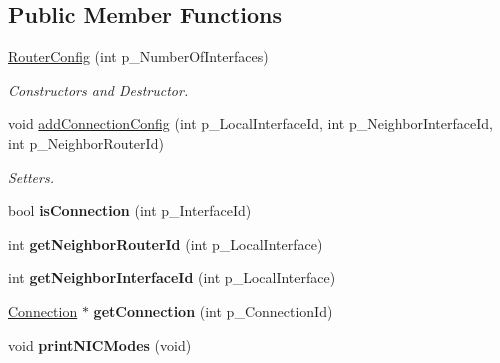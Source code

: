 \subsection*{Public Member Functions}
\begin{DoxyCompactItemize}
\item 
\hypertarget{classRouterConfig_a245e33f079a54805e0beb3497916ca5c}{\hyperlink{classRouterConfig_a245e33f079a54805e0beb3497916ca5c}{Router\-Config} (int p\-\_\-\-Number\-Of\-Interfaces)}\label{classRouterConfig_a245e33f079a54805e0beb3497916ca5c}

\begin{DoxyCompactList}\small\item\em Constructors and Destructor. \end{DoxyCompactList}\item 
\hypertarget{classRouterConfig_ab023773bfcea4de1fe396aae125979a9}{void \hyperlink{classRouterConfig_ab023773bfcea4de1fe396aae125979a9}{add\-Connection\-Config} (int p\-\_\-\-Local\-Interface\-Id, int p\-\_\-\-Neighbor\-Interface\-Id, int p\-\_\-\-Neighbor\-Router\-Id)}\label{classRouterConfig_ab023773bfcea4de1fe396aae125979a9}

\begin{DoxyCompactList}\small\item\em Setters. \end{DoxyCompactList}\item 
\hypertarget{classRouterConfig_a8ceb1f75bcb649d52e521e3133f0937d}{bool {\bfseries is\-Connection} (int p\-\_\-\-Interface\-Id)}\label{classRouterConfig_a8ceb1f75bcb649d52e521e3133f0937d}

\item 
\hypertarget{classRouterConfig_a047260a9321d06d46cab34c884c14ee7}{int {\bfseries get\-Neighbor\-Router\-Id} (int p\-\_\-\-Local\-Interface)}\label{classRouterConfig_a047260a9321d06d46cab34c884c14ee7}

\item 
\hypertarget{classRouterConfig_a0246df47bf6e9ff3c9c45be81c161787}{int {\bfseries get\-Neighbor\-Interface\-Id} (int p\-\_\-\-Local\-Interface)}\label{classRouterConfig_a0246df47bf6e9ff3c9c45be81c161787}

\item 
\hypertarget{classRouterConfig_a31ed6306e2aaf83fee80a046bdcfa7fb}{\hyperlink{classConnection}{Connection} $\ast$ {\bfseries get\-Connection} (int p\-\_\-\-Connection\-Id)}\label{classRouterConfig_a31ed6306e2aaf83fee80a046bdcfa7fb}

\item 
\hypertarget{classRouterConfig_a96ff8dc23d79b94afc220690d73eecbf}{void {\bfseries print\-N\-I\-C\-Modes} (void)}\label{classRouterConfig_a96ff8dc23d79b94afc220690d73eecbf}


\end{DoxyCompactItemize}
